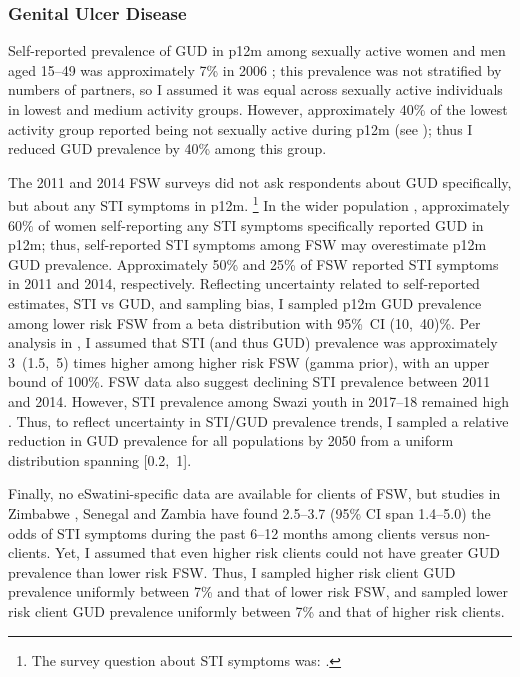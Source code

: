 \subsubsection{Genital Ulcer Disease}\label{model.par.tm.gud}
Self-reported prevalence of GUD in p12m among sexually active women and men aged 15--49
was approximately 7\% in 2006 \cite[Table~13.14]{SDHS2006};
this prevalence was not stratified by numbers of partners, so I assumed it was equal across
sexually active individuals in lowest and medium activity groups.
However, approximately 40\% of the lowest activity group %
reported being not sexually active during p12m \cite{SDHS2006,SHIMS2} (see );
thus I reduced GUD prevalence by 40\% among this group.
\par
The 2011 and 2014 FSW surveys did not ask respondents about GUD specifically,
but about any STI symptoms in p12m.%
\footnote{The survey question about STI symptoms was:
  .}
In the wider population \cite{SDHS2006},
approximately 60\% of women self-reporting any STI symptoms specifically reported GUD in p12m;
thus, self-reported STI symptoms among FSW may overestimate p12m GUD prevalence.
Approximately 50\% and 25\% of FSW reported STI symptoms in 2011 and 2014, respectively.
Reflecting uncertainty related to self-reported estimates, STI vs GUD, and sampling bias,
I sampled p12m GUD prevalence among lower risk FSW from
a beta distribution with 95\%~CI (10,~40)\%.
Per analysis in , I assumed that STI (and thus GUD) prevalence was
approximately 3~(1.5,~5) times higher among higher risk FSW (gamma prior),
with an upper bound of 100\%.
FSW data also suggest declining STI prevalence between 2011 and 2014.
However, STI prevalence among Swazi youth in 2017--18 remained high \cite{Jasumback2020}.
Thus, to reflect uncertainty in STI/GUD prevalence trends,
I sampled a relative reduction in GUD prevalence for all populations by 2050
from a uniform distribution spanning [0.2,~1].
\par
Finally, no eSwatini-specific data are available for clients of FSW,
but studies in Zimbabwe \cite{Cowan2005}, Senegal \cite{Santo2005} and Zambia \cite{Carrasco2020}
have found 2.5--3.7 (95\% CI span 1.4--5.0) the odds
of STI symptoms during the past 6--12 months among clients versus non-clients.
Yet, I assumed that even higher risk clients
could not have greater GUD prevalence than lower risk FSW.
Thus, I sampled higher risk client GUD prevalence uniformly between 7\% and that of lower risk FSW,
and sampled lower risk client GUD prevalence uniformly between 7\% and that of higher risk clients.